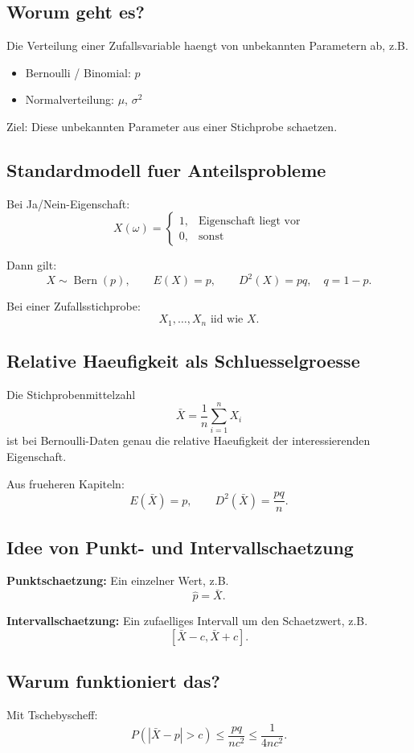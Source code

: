 \documentclass[a4paper,11pt]{article}
\begin{document}
\subsection{Worum geht es?}
Die Verteilung einer Zufallsvariable haengt von unbekannten Parametern ab, z.B.
\begin{itemize}
  \item Bernoulli / Binomial: $p$
  \item Normalverteilung: $\mu$, $\sigma^2$
\end{itemize}

Ziel:
Diese unbekannten Parameter aus einer Stichprobe schaetzen.

\subsection{Standardmodell fuer Anteilsprobleme}
Bei Ja/Nein-Eigenschaft:
\[
X(\omega)=
\begin{cases}
1,& \text{Eigenschaft liegt vor}\\
0,& \text{sonst}
\end{cases}
\]

Dann gilt:
\[
X\sim \operatorname{Bern}(p),\qquad E(X)=p,\qquad D^2(X)=pq,\quad q=1-p.
\]

Bei einer Zufallsstichprobe:
\[
X_1,\dots,X_n \text{ iid wie } X.
\]

\subsection{Relative Haeufigkeit als Schluesselgroesse}
Die Stichprobenmittelzahl
\[
\bar X=\frac1n\sum_{i=1}^n X_i
\]
ist bei Bernoulli-Daten genau die relative Haeufigkeit der interessierenden Eigenschaft.

Aus frueheren Kapiteln:
\[
E(\bar X)=p,\qquad D^2(\bar X)=\frac{pq}{n}.
\]

\subsection{Idee von Punkt- und Intervallschaetzung}
\textbf{Punktschaetzung:}
Ein einzelner Wert, z.B.
\[
\hat p=\bar X.
\]

\textbf{Intervallschaetzung:}
Ein zufaelliges Intervall um den Schaetzwert, z.B.
\[
[\bar X-c,\bar X+c].
\]

\subsection{Warum funktioniert das?}
Mit Tschebyscheff:
\[
P(|\bar X-p|>c)\le \frac{pq}{nc^2}\le \frac{1}{4nc^2}.
\]
\end{document}
